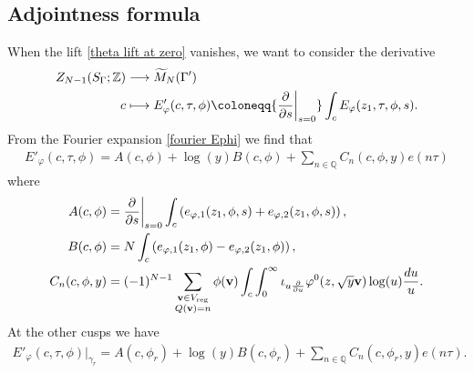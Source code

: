 \documentclass[twoside,a4paper,10pt]{article} %
\newcommand{\Mtil}{\widetilde{M}}
\newcommand{\dds}{\restr{\frac{\partial}{\partial s}}{s=0}}
\newcommand{\iotau}{\iota_{u\frac{\partial}{\partial u}}}
\newcommand{\8}{\infty}
\newcommand{\Z}{\mathbb{Z}}
\newcommand{\vbf}{\mathbf{v}}
\newcommand{\Q}{\mathbb{Q}}
\newcommand{\reg}{\mathrm{reg}}
\newcommand\restr[2]{{%
  \left.\kern-\nulldelimiterspace %
  #1 %
  \vphantom{\big|} %
  \right|_{#2} %
  }}
\theoremstyle{mytheoremstyle}
\theoremstyle{remark}
\numberwithin{equation}{section}
\begin{document}
\subsection{Adjointness formula}

When the lift \eqref{theta lift at zero} vanishes, we want to consider the derivative
\begin{align}
 Z_{N-1}(S_\Gamma;\Z) & \longrightarrow \Mtil_{N}(\Gamma') \\
 c & \longmapsto E'_\varphi(c,\tau,\phi) \coloneqq \dds \int_c E_\varphi(z_1,\tau,\phi,s).
\end{align}
From the Fourier expansion \eqref{fourier Ephi} we find that
\begin{align}
E'_\varphi(c,\tau,\phi)=A(c,\phi)+\log(y)B(c,\phi)+\sum_{n \in \Q} C_n(c,\phi,y)  e(n\tau)
\end{align}
where
\begin{align}
A(c,\phi) & = \dds \int_c \left ( e_{\varphi,1}(z_1,\phi,s) + e_{\varphi,2}(z_1,\phi,s) \right ), \\
B(c,\phi) & =N\int_c \left ( e_{\varphi,1}(z_1,\phi) - e_{\varphi,2}(z_1,\phi) \right ), \\
C_n(c,\phi,y) & = (-1)^{N-1} \sum_{\substack{\vbf \in V_\reg \\ Q(\vbf)=n}} \phi(\vbf) \int_c \int_0^\8 \iotau \varphi^0(z,\sqrt{y}\vbf) \log(u) \frac{du}{u}.
\end{align}
At the other cusps we have
\begin{align}
E'_\varphi(c,\tau,\phi)\vert_{\gamma_r}=A(c,\phi_r)+\log(y)B(c,\phi_r)+\sum_{n \in \Q} C_n(c,\phi_r,y)  e(n\tau).
\end{align}
\end{document}
